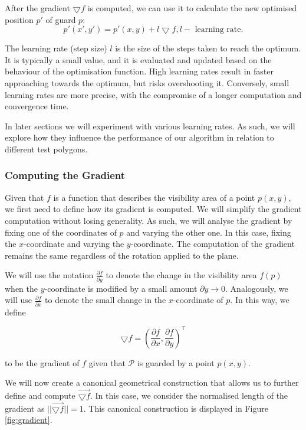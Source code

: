 After the gradient $\bigtriangledown f$ is computed, we can use it to calculate the new optimised position $p'$ of guard $p$: $$p'(x', y') = p'(x, y) + l\bigtriangledown f, l - \text{ learning rate}.$$

The learning rate (step size) $l$ is the size of the steps taken to reach the optimum. It is typically a small value, and it is evaluated and updated based on the behaviour of the optimisation function. High learning rates result in faster approaching towards the optimum, but risks overshooting it. Conversely, small learning rates are more precise, with the compromise of a longer computation and convergence time.

In later sections we will experiment with various learning rates. As such, we will explore how they influence the performance of our algorithm in relation to different test polygons. 


\subsubsection{Computing the Gradient}

Given that $f$ is a function that describes the visibility area of a point $p(x, y)$, we first need to define how its gradient is computed. We will simplify the gradient computation without losing generality. As such, we will analyse the gradient by fixing one of the coordinates of $p$ and varying the other one. In this case, fixing the $x$-coordinate and varying the $y$-coordinate. The computation of the gradient remains the same regardless of the rotation applied to the plane.


We will use the notation $\frac{\partial f}{\partial y}$ to denote the change in the visibility area $f(p)$ when the $y$-coordinate is modified by a small amount $\partial y \rightarrow 0$. Analogously, we will use $\frac{\partial f}{\partial x}$ to denote the small change in the $x$-coordinate of $p$. In this way, we define 

\begin{equation}
    \bigtriangledown f = (\frac{\partial f}{\partial x}, \frac{\partial f}{\partial y})^\intercal \label{eq:gradient}
\end{equation}

to be the gradient of $f$ given that $\mathcal P$ is guarded by a point $p(x, y)$. 

We will now create a canonical geometrical construction that allows us to further define and compute $\vec{\bigtriangledown f}$. In this case, we consider the normalised length of the gradient as $||\vec{\bigtriangledown f}|| = 1$. This canonical construction is displayed in Figure \ref{fig:gradient}. 

